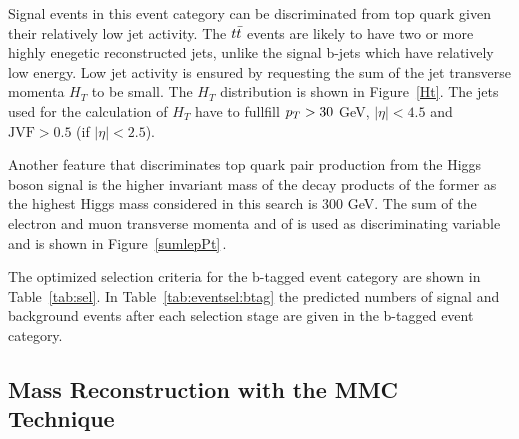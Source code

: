 Signal events in this event category can be discriminated from  top quark given their relatively low jet activity. 
The $t\bar{t}$ events are likely to have two or more highly enegetic reconstructed jets, unlike the signal
b-jets which have relatively low energy. Low jet activity is ensured by requesting the sum of the jet transverse momenta $H_T$ to be small.
The $H_T$ distribution is shown in Figure~\ref{Ht}. The jets used for the calculation of $H_T$  have 
to fullfill $p_{T} > 30 $ GeV, $|\eta| < 4.5$  and $\text{JVF} > 0.5 $ (if $|\eta| < 2.5$).

Another feature that discriminates top quark  pair production from the Higgs boson signal is the higher invariant mass 
of the decay products of the former as the highest Higgs mass considered in this  search is 300 GeV.
The sum of the electron and muon transverse momenta and of  \met is  used as 
discriminating variable and is shown in Figure~\ref{sumlepPt}$\,.$

The optimized selection criteria for the b-tagged event category are shown in Table~\ref{tab:sel}.
In Table~\ref{tab:eventsel:btag} the predicted numbers of signal and background events after each selection stage are given in 
 the b-tagged event category.






\subsection{Mass Reconstruction with the MMC Technique}\label{sec:mmc}


